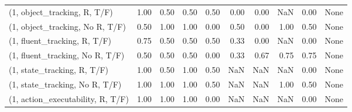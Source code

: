 \begin{table*}[h!]
\begin{adjustbox}{width=2\columnwidth,center}
\begin{tabular}{lrrr|rrr|rrr}
\midrule
(1, object\_tracking, R, T/F)         &                      1.00 &                  0.50 &                      0.50 &                          0.50 &                      0.00 &                          0.00 &                                    NaN &                               0.00 &                                  None \\
(1, object\_tracking, No R, T/F)      &                      0.50 &                  1.00 &                      1.00 &                          0.00 &                      0.50 &                          0.00 &                                   1.00 &                               0.50 &                                  None \\
(1, fluent\_tracking, R, T/F)         &                      0.75 &                  0.50 &                      0.50 &                          0.50 &                      0.33 &                          0.00 &                                    NaN &                               0.00 &                                  None \\
(1, fluent\_tracking, No R, T/F)      &                      0.50 &                  0.50 &                      0.50 &                          0.00 &                      0.33 &                          0.67 &                                   0.75 &                               0.75 &                                  None \\
(1, state\_tracking, R, T/F)          &                      1.00 &                  0.50 &                      1.00 &                          0.50 &                       NaN &                           NaN &                                    NaN &                               0.00 &                                  None \\
(1, state\_tracking, No R, T/F)       &                      1.00 &                  1.00 &                      1.00 &                          0.50 &                       NaN &                           NaN &                                   1.00 &                               0.50 &                                  None \\
(1, action\_executability, R, T/F)    &                      1.00 &                  1.00 &                      1.00 &                          0.00 &                       NaN &                           NaN &                                    NaN &                               0.00 &                                  None \\

\end{tabular}
\end{adjustbox}
\end{table*}
